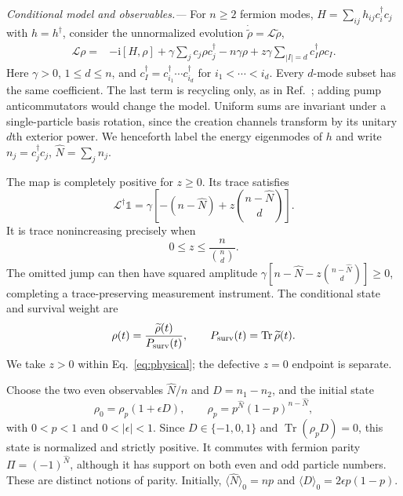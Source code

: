 \documentclass[aps,pra,reprint,superscriptaddress,nofootinbib]{revtex4-2}
\newcommand{\Tr}{\operatorname{Tr}}
\newcommand{\ii}{\mathrm{i}}
\begin{document}
\emph{Conditional model and observables.---}
For $n\ge2$ fermion modes, $H=\sum_{ij}h_{ij}c_i^\dagger c_j$ with $h=h^\dagger$, consider the unnormalized evolution $\dot{\widetilde\rho}=\mathcal L\widetilde\rho$,
\begin{align}
\mathcal L\rho={}&-\ii[H,\rho]+\gamma\sum_j c_j\rho c_j^\dagger-n\gamma\rho
 +z\gamma\sum_{|I|=d}c_I^\dagger\rho c_I .
\label{eq:model}
\end{align}
Here $\gamma>0$, $1\le d\le n$, and $c_I^\dagger=c_{i_1}^\dagger\cdots c_{i_d}^\dagger$ for $i_1<\cdots<i_d$. Every $d$-mode subset has the same coefficient. The last term is recycling only, as in Ref.~\cite{XuYi}; adding pump anticommutators would change the model. Uniform sums are invariant under a single-particle basis rotation, since the creation channels transform by its unitary $d$th exterior power. We henceforth label the energy eigenmodes of $h$ and write $n_j=c_j^\dagger c_j$, $\hat N=\sum_j n_j$.

The map is completely positive for $z\ge0$. Its trace satisfies
\begin{equation}
\mathcal L^\dagger\mathbb1=\gamma\left[-(n-\hat N)+z\binom{n-\hat N}{d}\right].
\end{equation}
It is trace nonincreasing precisely when
\begin{equation}
0\le z\le \frac{n}{\binom nd}.
\label{eq:physical}
\end{equation}
The omitted jump can then have squared amplitude $\gamma[n-\hat N-z\binom{n-\hat N}{d}]\ge0$, completing a trace-preserving measurement instrument. The conditional state and survival weight are
\begin{equation}
\rho(t)=\frac{\widetilde\rho(t)}{P_{\rm surv}(t)},\qquad
P_{\rm surv}(t)=\Tr\widetilde\rho(t).
\label{eq:conditional}
\end{equation}
We take $z>0$ within Eq.~\eqref{eq:physical}; the defective $z=0$ endpoint is separate.

Choose the two even observables $\hat N/n$ and $D=n_1-n_2$, and the initial state
\begin{equation}
\rho_0=\rho_p(1+\epsilon D),\qquad
\rho_p=p^{\hat N}(1-p)^{n-\hat N},
\label{eq:initial}
\end{equation}
with $0<p<1$ and $0<|\epsilon|<1$. Since $D\in\{-1,0,1\}$ and $\Tr(\rho_pD)=0$, this state is normalized and strictly positive. It commutes with fermion parity $\Pi=(-1)^{\hat N}$, although it has support on both even and odd particle numbers. These are distinct notions of parity. Initially, $\langle\hat N\rangle_0=np$ and $\langle D\rangle_0=2\epsilon p(1-p)$.
\end{document}

